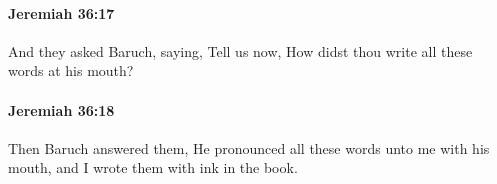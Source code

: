 		\paragraph{Jeremiah 36:17} %
			\label{JEREMIAH-36-17}

			And they asked Baruch, saying, Tell us now, How didst thou write all these words at his mouth?


		\paragraph{Jeremiah 36:18} %
			\label{JEREMIAH-36-18}

			Then Baruch answered them, He pronounced all these words unto me with his mouth, and I wrote them with ink in the book.


